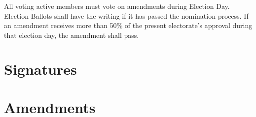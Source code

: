 \documentclass[11pt]{article}
\begin{document}
All voting active members must vote on amendments during Election Day. 
Election Ballots shall have the writing if it has passed the nomination process. 
If an amendment receives more than 50\% of the present electorate’s approval during that election day, the amendment shall pass.


\pagebreak  
\section{Signatures}
\label{sec:orgafaa966}
\pagebreak

\section{Amendments}
\label{sec:org17ac352}
\end{document}
